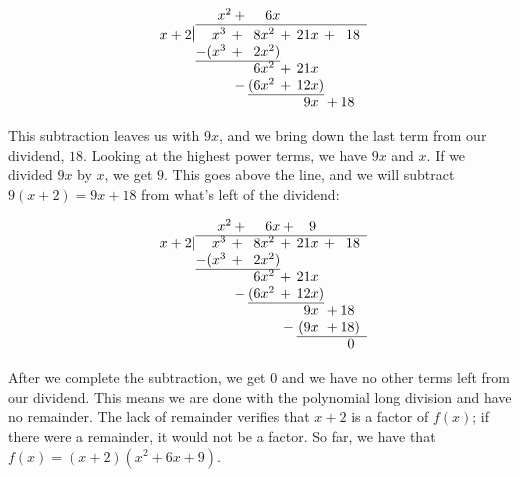 {\begin{equation*}
\begin{array}{r@{}r@{}c@{}r@{}c@{}r@{}c@{}r}
& x^2 & + & 6x &  &  \phantom{x}& & \\ \cline{2-8}
 \vert & & & & & & & \\[-10pt]
x+2  \vert & x^3 \phantom{)}& + \phantom{)} & 8x^2 \phantom{)}& + \phantom{)} & 21x \phantom{)}& + \phantom{)} & 18\\
& -(x^3 \phantom{)} & + \phantom{)} & 2x^2) & & & & \\ \cline{2-4}
 & & & 6x^2 \phantom{)} & + \phantom{)} & 21x \phantom{)} & & \\
 & & - & (6x^2 \phantom{)} & + \phantom{)} & 12x) & & \\ \cline{4-6}
 & & & & & 9x \phantom{)} & + & 18 \phantom{)} \\ 
 \end{array}
\end{equation*}

\noindent
This subtraction leaves us with $9x$, and we bring down the last term from our dividend, $18$. Looking at the highest power terms, we have $9x$ and $x$. If we divided $9x$ by $x$, we get $9$. This goes above the line, and we will subtract $9(x+2)=9x+18$ from what's left of the dividend:


\begin{equation*}
\begin{array}{r@{}r@{}c@{}r@{}c@{}r@{}c@{}r}
& x^2 & + & 6x & + & 9 \phantom{x}& & \\ \cline{2-8}
x+2  \vert & x^3 \phantom{)}& + \phantom{)} & 8x^2 \phantom{)}& + \phantom{)} & 21x \phantom{)}& + \phantom{)} & 18\\
& -(x^3 \phantom{)} & + \phantom{)} & 2x^2) & & & & \\ \cline{2-4}
 & & & 6x^2 \phantom{)} & + \phantom{)} & 21x \phantom{)} & & \\
 & & - & (6x^2 \phantom{)} & + \phantom{)} & 12x) & & \\ \cline{4-6}
 & & & & & 9x \phantom{)} & + & 18 \phantom{)} \\ 
 & & & & - & (9x \phantom{)} & + & 18) \\  \cline{6-8}
 & & & &  & & & 0 \phantom{)}
\end{array}
\end{equation*}

\noindent
After we complete the subtraction, we get $0$ and we have no other terms left from our dividend. This means we are done with the polynomial long division and have no remainder. The lack of remainder verifies that $x+2$ is a factor of $f(x)$; if there were a remainder, it would not be a factor. So far, we have that $f(x) = (x+2)(x^2+6x+9)$.

}
